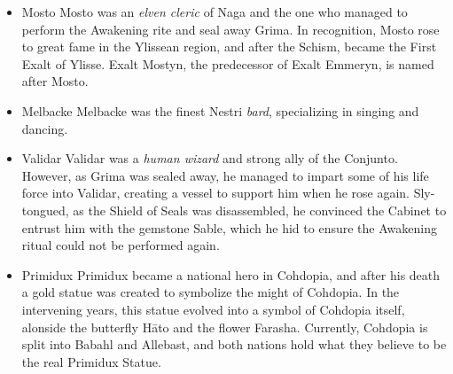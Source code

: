 \begin{itemize}
\item Mosto
Mosto was an \textit{elven cleric} of Naga and the one who managed to perform the Awakening rite and seal away Grima. In recognition, Mosto rose to great fame in the Ylissean region, and after the Schism, became the First Exalt of Ylisse. Exalt Mostyn, the predecessor of Exalt Emmeryn, is named after Mosto.

\item Melbacke
Melbacke was the finest Nestri \textit{bard}, specializing in singing and dancing.

\item Validar
Validar was a \textit{human wizard} and strong ally of the Conjunto. However, as Grima was sealed away, he managed to impart some of his life force into Validar, creating a vessel to support him when he rose again. Sly-tongued, as the Shield of Seals was disassembled, he convinced the Cabinet to entrust him with the gemstone Sable, which he hid to ensure the Awakening ritual could not be performed again.

\item Primidux
Primidux became a national hero in Cohdopia, and after his death a gold statue was created to symbolize the might of Cohdopia. In the intervening years, this statue evolved into a symbol of Cohdopia itself, alonside the butterfly H\=ato and the flower Farasha. Currently, Cohdopia is split into Babahl and Allebast, and both nations hold what they believe to be the real Primidux Statue.
\end{itemize}
